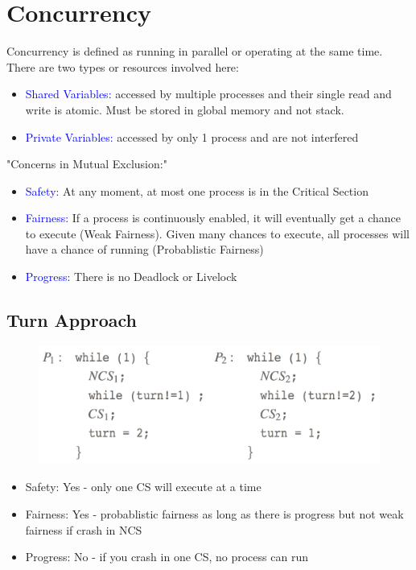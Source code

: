 \documentclass{hw}
\begin{document}
\section{Concurrency}
Concurrency is defined as running in parallel or operating at the same time. 
There are two types or resources involved here:

\begin{itemize}
  \item \textcolor{blue}{Shared Variables:} accessed by multiple processes and 
    their single read and write is atomic. Must be stored in global memory and not
    stack.
  \item \textcolor{blue}{Private Variables:} accessed by only 1 process and are
    not interfered
\end{itemize}

"Concerns in Mutual Exclusion:"
\begin{itemize}
  \item \textcolor{blue}{Safety:} At any moment, at most one process is in the 
  Critical Section
  \item \textcolor{blue}{Fairness:} If a process is continuously enabled, it will
    eventually get a chance to execute (Weak Fairness). Given many chances to
    execute, all processes will have a chance of running (Probablistic Fairness)
  \item \textcolor{blue}{Progress:} There is no Deadlock or Livelock
\end{itemize}

\subsection{Turn Approach}
\begin{figure}[H]
  \centering
  \includegraphics[scale=.4]{img/turn}
\end{figure}

\begin{itemize}
  \item Safety:    Yes - only one CS will execute at a time                 
  \item Fairness:  Yes  - probablistic fairness as long as there is progress but
    not weak fairness if crash in NCS
  \item Progress:  No - if you crash in one CS, no process can run          
\end{itemize}
\end{document}
